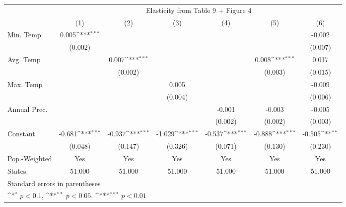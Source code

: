 {
\def\sym#1{\ifmmode^{#1}\else\(^{#1}\)\fi}
\begin{tabular}{l*{6}{c}}
\hline\hline
            &\multicolumn{6}{c}{Elasticity from Table 9 + Figure 4}                                                                             \\
            &\multicolumn{1}{c}{(1)}         &\multicolumn{1}{c}{(2)}         &\multicolumn{1}{c}{(3)}         &\multicolumn{1}{c}{(4)}         &\multicolumn{1}{c}{(5)}         &\multicolumn{1}{c}{(6)}         \\
\hline
Min. Temp   &       0.005\sym{***}&                     &                     &                     &                     &      -0.002         \\
            &     (0.002)         &                     &                     &                     &                     &     (0.007)         \\
[1em]
Avg. Temp   &                     &       0.007\sym{***}&                     &                     &       0.008\sym{***}&       0.017         \\
            &                     &     (0.002)         &                     &                     &     (0.003)         &     (0.015)         \\
[1em]
Max. Temp   &                     &                     &       0.005         &                     &                     &      -0.009         \\
            &                     &                     &     (0.004)         &                     &                     &     (0.006)         \\
[1em]
Annual Prec.&                     &                     &                     &      -0.001         &      -0.003         &      -0.005         \\
            &                     &                     &                     &     (0.002)         &     (0.002)         &     (0.003)         \\
[1em]
Constant    &      -0.681\sym{***}&      -0.937\sym{***}&      -1.029\sym{***}&      -0.537\sym{***}&      -0.888\sym{***}&      -0.505\sym{**} \\
            &     (0.048)         &     (0.147)         &     (0.326)         &     (0.071)         &     (0.130)         &     (0.230)         \\
\hline
Pop.-Weighted&         Yes         &         Yes         &         Yes         &         Yes         &         Yes         &         Yes         \\
States:     &      51.000         &      51.000         &      51.000         &      51.000         &      51.000         &      51.000         \\
\hline\hline
\multicolumn{7}{l}{\footnotesize Standard errors in parentheses}\\
\multicolumn{7}{l}{\footnotesize \sym{*} \(p<0.1\), \sym{**} \(p<0.05\), \sym{***} \(p<0.01\)}\\
\end{tabular}
}
